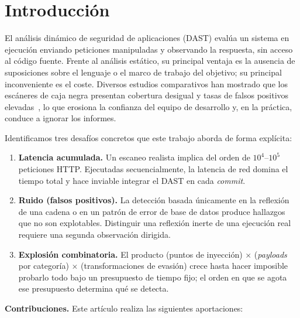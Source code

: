 
\section{Introducción}
\label{sec:intro}

El análisis dinámico de seguridad de aplicaciones (DAST) evalúa un sistema en
ejecución enviando peticiones manipuladas y observando la respuesta, sin
acceso al código fuente. Frente al análisis estático, su principal ventaja es
la ausencia de suposiciones sobre el lenguaje o el marco de trabajo del
objetivo; su principal inconveniente es el coste. Diversos estudios
comparativos han mostrado que los escáneres de caja negra presentan cobertura
desigual y tasas de falsos positivos
elevadas~\cite{doupe2010johnny,bau2010state,parvez2015analysis}, lo que erosiona
la confianza del equipo de desarrollo y, en la práctica, conduce a ignorar los
informes.

Identificamos tres desafíos concretos que este trabajo aborda de forma
explícita:

\begin{enumerate}
  \item \textbf{Latencia acumulada.} Un escaneo realista implica del orden de
  $10^4$--$10^5$ peticiones HTTP. Ejecutadas secuencialmente, la latencia de
  red domina el tiempo total y hace inviable integrar el DAST en cada
  \emph{commit}.
  \item \textbf{Ruido (falsos positivos).} La detección basada únicamente en
  la reflexión de una cadena o en un patrón de error de base de datos produce
  hallazgos que no son explotables. Distinguir una reflexión inerte de una
  ejecución real requiere una segunda observación dirigida.
  \item \textbf{Explosión combinatoria.} El producto (puntos de inyección)
  $\times$ (\emph{payloads} por categoría) $\times$ (transformaciones de
  evasión) crece hasta hacer imposible probarlo todo bajo un presupuesto de
  tiempo fijo; el orden en que se agota ese presupuesto determina qué se
  detecta.
\end{enumerate}

\noindent\textbf{Contribuciones.} Este artículo realiza las siguientes
aportaciones:

